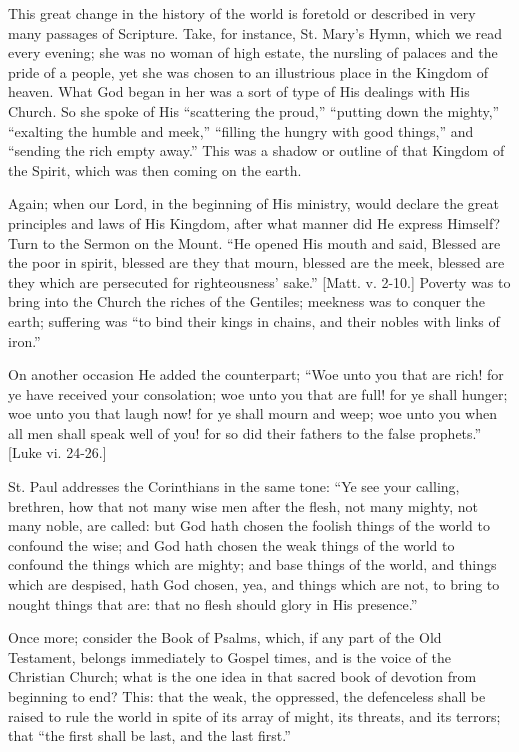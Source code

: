 This great change in the history of the world is foretold or
described in very many passages of Scripture. Take, for instance, St.
Mary's Hymn, which we read every evening; she was no woman of high
estate, the nursling of palaces and the pride of a people, yet she was
chosen to an illustrious place in the Kingdom of heaven. What God
began in her was a sort of type of His dealings with His Church. So
she spoke of His ``scattering the proud,'' ``putting down
the mighty,'' ``exalting the humble and meek,''
``filling the hungry with good things,'' and ``sending the
rich empty away.'' This was a shadow or outline of that Kingdom of
the Spirit, which was then coming on the earth.

Again; when our Lord, in the beginning of His ministry, would
declare the great principles and laws of His Kingdom, after what
manner did He express Himself? Turn to the Sermon on the Mount.
``He opened His mouth and said, Blessed are the poor in spirit,
blessed are they that mourn, blessed are the meek, blessed are they
which are persecuted for righteousness' sake.'' [Matt. v. 2-10.]
Poverty was to bring into the Church the riches of the Gentiles;
meekness was to conquer the earth; suffering was ``to bind their
kings in chains, and their nobles with links of iron.''

On another occasion He added the counterpart; ``Woe unto you
that are rich! for ye have received your consolation; woe unto you
that are full! for ye shall hunger; woe unto you that laugh now! for
ye shall mourn and weep; woe unto you when all men shall speak well of
you! for so did their fathers to the false prophets.'' [Luke vi.
24-26.]

St. Paul addresses the Corinthians in the same tone: ``Ye see
your calling, brethren, how that not many wise men after the flesh,
not many mighty, not many noble, are called: but God hath chosen the
foolish things of the world to confound the wise; and God hath chosen
the weak things of the world to confound the things which are mighty;
and base things of the world, and things which are despised, hath God
chosen, yea, and things which are not, to bring to nought things that
are: that no flesh should glory in His presence.''

Once more; consider the Book of Psalms, which, if any part of the
Old Testament, belongs immediately to Gospel times, and is the voice
of the Christian Church; what is the one idea in that sacred book of
devotion from beginning to end? This: that the weak, the oppressed,
the defenceless shall be raised to rule the world in spite of its
array of might, its threats, and its terrors; that ``the first
shall be last, and the last first.''

